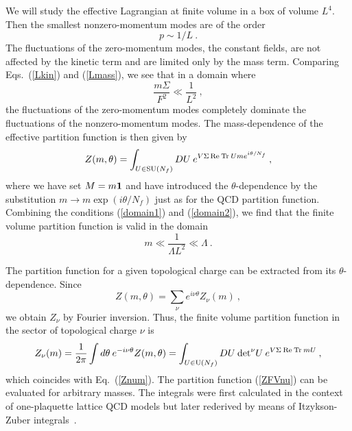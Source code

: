We will study the effective Lagrangian at finite volume in a box of
volume $L^4$. Then the smallest nonzero-momentum modes are of the
order
\begin{equation}
  p \sim 1/L\:.
\end{equation}
The fluctuations of the zero-momentum modes, the constant fields, are
not affected by the kinetic term and are limited only by the mass
term.  Comparing Eqs.~(\ref{Lkin}) and (\ref{Lmass}), we see that in a
domain where
\begin{equation}
  \label{domain2}
  \frac {m\Sigma}{F^2} \ll \frac 1{L^2}\:,
\end{equation}
the fluctuations of the zero-momentum modes completely dominate the
fluctuations of the nonzero-momentum modes.  The mass-dependence of
the effective partition function is then given by \cite{GL,Leut92}
\begin{equation}
  Z(m,\theta) = \int_{U\in {\rm SU}(N_f)} DU\: e^{V\Sigma\,
    {\rm Re\:}{\rm Tr\:} Ume^{i\theta/N_f}}\:,
  \label{ZFV}
\end{equation} 
where we have set $M=m{\bf 1}$ and have introduced the
$\theta$-dependence by the substitution $m \rightarrow
m\exp(i\theta/N_f)$ just as for the QCD partition function.  Combining
the conditions (\ref{domain1}) and (\ref{domain2}), we find that the
finite volume partition function is valid in the domain
\cite{GL,Leut92}
\begin{equation} 
  m \ll \frac{1}{\Lambda L^2} \ll \Lambda\:.
  \label{range}
\end{equation}

The partition function for a given topological charge can be extracted
from its $\theta$-dependence.  Since
\begin{equation} 
  Z(m,\theta) = \sum_\nu e^{i\nu\theta} Z_\nu(m)\:,
\end{equation}
we obtain $Z_\nu$ by Fourier inversion. Thus, the finite volume
partition function in the sector of topological charge $\nu$ is
\begin{equation}
  Z_\nu(m) = \frac 1{2\pi}\int d\theta \:e^{-i\nu\theta}Z(m,\theta) 
  =\int_{U\in {\rm U}(N_f)}DU\:{\det}^\nu U
  \:e^{V\Sigma\: {\rm Re\:}{\rm Tr\:} m U}\:,
\label{ZFVnu}
\end{equation}
which coincides with Eq.~(\ref{Znum}).  The partition function
(\ref{ZFVnu}) can be evaluated for arbitrary masses.  The integrals
were first calculated in the context of one-plaquette lattice QCD
models \cite{brower} but later rederived by means of Itzykson-Zuber
integrals~\cite{Russian,Guhr,seneru}.

